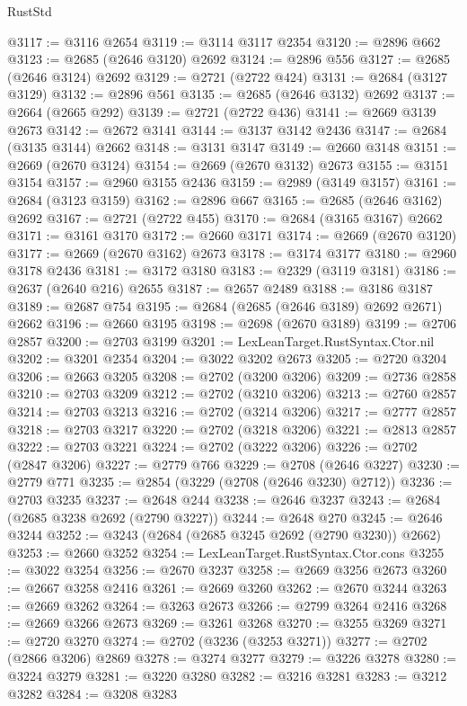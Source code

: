\begin{lexlean}{RustStd}
\begin{coremodule}
@3117 := @3116 @2654
@3119 := @3114 @3117 @2354
@3120 := @2896 @662
@3123 := @2685 (@2646 @3120) @2692
@3124 := @2896 @556
@3127 := @2685 (@2646 @3124) @2692
@3129 := @2721 (@2722 @424)
@3131 := @2684 (@3127 @3129)
@3132 := @2896 @561
@3135 := @2685 (@2646 @3132) @2692
@3137 := @2664 (@2665 @292)
@3139 := @2721 (@2722 @436)
@3141 := @2669 @3139 @2673
@3142 := @2672 @3141
@3144 := @3137 @3142 @2436
@3147 := @2684 (@3135 @3144) @2662
@3148 := @3131 @3147
@3149 := @2660 @3148
@3151 := @2669 (@2670 @3124)
@3154 := @2669 (@2670 @3132) @2673
@3155 := @3151 @3154
@3157 := @2960 @3155 @2436
@3159 := @2989 (@3149 @3157)
@3161 := @2684 (@3123 @3159)
@3162 := @2896 @667
@3165 := @2685 (@2646 @3162) @2692
@3167 := @2721 (@2722 @455)
@3170 := @2684 (@3165 @3167) @2662
@3171 := @3161 @3170
@3172 := @2660 @3171
@3174 := @2669 (@2670 @3120)
@3177 := @2669 (@2670 @3162) @2673
@3178 := @3174 @3177
@3180 := @2960 @3178 @2436
@3181 := @3172 @3180
@3183 := @2329 (@3119 @3181)
@3186 := @2637 (@2640 @216) @2655
@3187 := @2657 @2489
@3188 := @3186 @3187
@3189 := @2687 @754
@3195 := @2684 (@2685 (@2646 @3189) @2692 @2671) @2662
@3196 := @2660 @3195
@3198 := @2698 (@2670 @3189)
@3199 := @2706 @2857
@3200 := @2703 @3199
@3201 := LexLeanTarget.RustSyntax.Ctor.nil
@3202 := @3201 @2354
@3204 := @3022 @3202 @2673
@3205 := @2720 @3204
@3206 := @2663 @3205
@3208 := @2702 (@3200 @3206)
@3209 := @2736 @2858
@3210 := @2703 @3209
@3212 := @2702 (@3210 @3206)
@3213 := @2760 @2857
@3214 := @2703 @3213
@3216 := @2702 (@3214 @3206)
@3217 := @2777 @2857
@3218 := @2703 @3217
@3220 := @2702 (@3218 @3206)
@3221 := @2813 @2857
@3222 := @2703 @3221
@3224 := @2702 (@3222 @3206)
@3226 := @2702 (@2847 @3206)
@3227 := @2779 @766
@3229 := @2708 (@2646 @3227)
@3230 := @2779 @771
@3235 := @2854 (@3229 (@2708 (@2646 @3230) @2712))
@3236 := @2703 @3235
@3237 := @2648 @244
@3238 := @2646 @3237
@3243 := @2684 (@2685 @3238 @2692 (@2790 @3227))
@3244 := @2648 @270
@3245 := @2646 @3244
@3252 := @3243 (@2684 (@2685 @3245 @2692 (@2790 @3230)) @2662)
@3253 := @2660 @3252
@3254 := LexLeanTarget.RustSyntax.Ctor.cons
@3255 := @3022 @3254
@3256 := @2670 @3237
@3258 := @2669 @3256 @2673
@3260 := @2667 @3258 @2416
@3261 := @2669 @3260
@3262 := @2670 @3244
@3263 := @2669 @3262
@3264 := @3263 @2673
@3266 := @2799 @3264 @2416
@3268 := @2669 @3266 @2673
@3269 := @3261 @3268
@3270 := @3255 @3269
@3271 := @2720 @3270
@3274 := @2702 (@3236 (@3253 @3271))
@3277 := @2702 (@2866 @3206) @2869
@3278 := @3274 @3277
@3279 := @3226 @3278
@3280 := @3224 @3279
@3281 := @3220 @3280
@3282 := @3216 @3281
@3283 := @3212 @3282
@3284 := @3208 @3283

\end{coremodule}
\end{lexlean}

